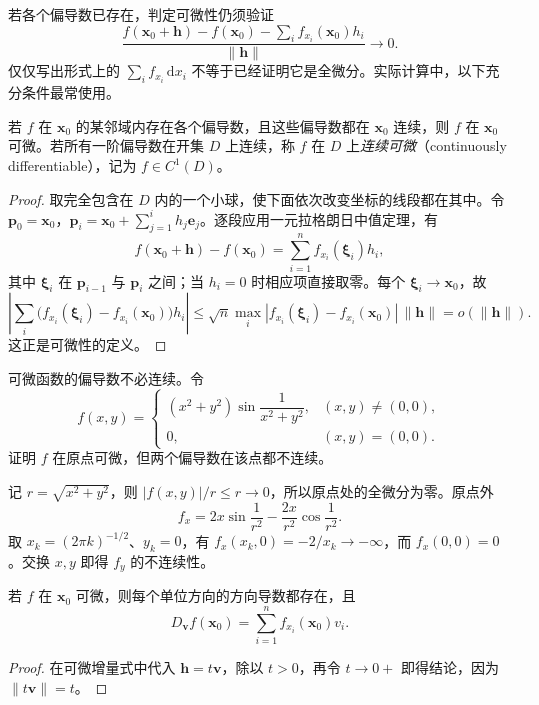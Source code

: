 \documentclass[UTF8,12pt,a4paper,fontset=fandol]{ctexbook}
\begin{document}
若各个偏导数已存在，判定可微性仍须验证
\[
    \frac{f(\boldsymbol x_0+\boldsymbol h)-f(\boldsymbol x_0)
       -\sum_i f_{x_i}(\boldsymbol x_0)h_i}{\|\boldsymbol h\|}\longrightarrow0.
\]
仅仅写出形式上的 $\sum_i f_{x_i}\,\mathrm dx_i$ 不等于已经证明它是全微分。实际计算中，以下充分条件最常使用。

\begin{theorem}
\label{thm:continuous-partials-imply-differentiability-ch14}
若 $f$ 在 $\boldsymbol x_0$ 的某邻域内存在各个偏导数，且这些偏导数都在 $\boldsymbol x_0$ 连续，则 $f$ 在 $\boldsymbol x_0$ 可微。若所有一阶偏导数在开集 $D$ 上连续，称 $f$ 在 $D$ 上\emph{连续可微}（continuously differentiable），记为 $f\in C^1(D)$。
\end{theorem}
\begin{proof}
取完全包含在 $D$ 内的一个小球，使下面依次改变坐标的线段都在其中。令
$\boldsymbol p_0=\boldsymbol x_0$，$\boldsymbol p_i=\boldsymbol x_0+\sum_{j=1}^i h_j\boldsymbol e_j$。逐段应用一元拉格朗日中值定理，有
\[
    f(\boldsymbol x_0+\boldsymbol h)-f(\boldsymbol x_0)
    =\sum_{i=1}^n f_{x_i}(\boldsymbol\xi_i)h_i,
\]
其中 $\boldsymbol\xi_i$ 在 $\boldsymbol p_{i-1}$ 与 $\boldsymbol p_i$ 之间；当 $h_i=0$ 时相应项直接取零。每个 $\boldsymbol\xi_i\to\boldsymbol x_0$，故
\[
    \left|\sum_i\bigl(f_{x_i}(\boldsymbol\xi_i)-f_{x_i}(\boldsymbol x_0)\bigr)h_i\right|
    \leq\sqrt n\max_i|f_{x_i}(\boldsymbol\xi_i)-f_{x_i}(\boldsymbol x_0)|\,
       \|\boldsymbol h\|
    =o(\|\boldsymbol h\|).
\]
这正是可微性的定义。
\end{proof}

\begin{example}
\label{ex:differentiable-discontinuous-partials-ch14}
可微函数的偏导数不必连续。令
\[
    f(x,y)=
    \begin{cases}
        (x^2+y^2)\sin\dfrac1{x^2+y^2},&(x,y)\ne(0,0),\\
        0,&(x,y)=(0,0).
    \end{cases}
\]
证明 $f$ 在原点可微，但两个偏导数在该点都不连续。
\end{example}
\begin{solve}
记 $r=\sqrt{x^2+y^2}$，则 $|f(x,y)|/r\leq r\to0$，所以原点处的全微分为零。原点外
\[
    f_x=2x\sin\frac1{r^2}-\frac{2x}{r^2}\cos\frac1{r^2}.
\]
取 $x_k=(2\pi k)^{-1/2}$、$y_k=0$，有 $f_x(x_k,0)=-2/x_k\to-\infty$，而 $f_x(0,0)=0$。交换 $x,y$ 即得 $f_y$ 的不连续性。
\end{solve}

\begin{proposition}
\label{prop:directional-derivative-of-differentiable-function-ch14}
若 $f$ 在 $\boldsymbol x_0$ 可微，则每个单位方向的方向导数都存在，且
\begin{equation}
\label{eq:directional-derivative-formula-ch14}
    D_{\boldsymbol v}f(\boldsymbol x_0)
    =\sum_{i=1}^n f_{x_i}(\boldsymbol x_0)v_i.
\end{equation}
\end{proposition}
\begin{proof}
在可微增量式中代入 $\boldsymbol h=t\boldsymbol v$，除以 $t>0$，再令 $t\to0+$ 即得结论，因为 $\|t\boldsymbol v\|=t$。
\end{proof}
\end{document}
